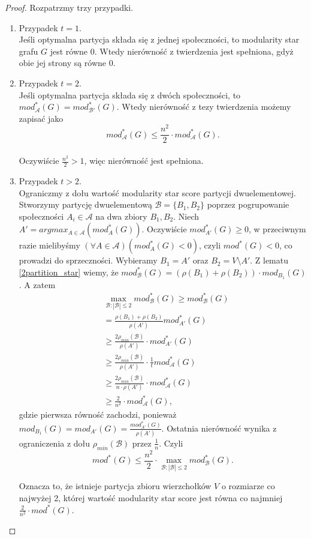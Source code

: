 \documentclass[letterpaper,12pt]{article}
\begin{document}
\begin{proof}
  Rozpatrzmy trzy przypadki.
  \begin{enumerate}
    \item Przypadek \(t=1\).\\
          Jeśli optymalna partycja składa się z jednej społeczności, to modularity star grafu \(G\) jest równe 0. Wtedy nierówność z twierdzenia jest spełniona, gdyż obie jej strony są równe 0.
    \item Przypadek \(t=2\).\\
          Jeśli optymalna partycja składa się z dwóch społeczności, to \(mod_{\mathcal{A}}^*(G) = mod_{\mathcal{B'}}^*(G)\). Wtedy nierówność z tezy twierdzenia możemy zapisać jako
          \[mod_{\mathcal{A}}^*(G) \leq \frac{n^2}{2} \cdot mod_{\mathcal{A}}^*(G).\]\\
          Oczywiście \(\frac{n^2}{2}>1\), więc nierówność jest spełniona.
    \item Przypadek \(t>2\).\\
          Ograniczmy z dołu wartość modularity star score  partycji dwuelementowej. Stworzymy partycję dwuelementową \(\mathcal{B}=\{B_1,B_2\}\) poprzez pogrupowanie społeczności \(A_i\in\mathcal{A}\) na dwa zbiory \(B_1,B_2\). Niech \(A'=argmax_{A \in\mathcal{A}}(mod_{A}^*(G))\). Oczywiście \(mod_{A'}^*(G) \geq 0\), w przeciwnym razie mielibyśmy \((\forall A \in \mathcal{A}) (mod_A^*(G) < 0)\), czyli \(mod^*(G) < 0\), co prowadzi do sprzeczności. Wybieramy \(B_1=A'\) oraz \(B_2=V \setminus A'\). Z lematu \ref{2partition_star} wiemy, że \(mod_{\mathcal{B}}^*(G)=(\rho(B_1)+\rho(B_2))\cdot mod_{B_1}(G)\). A zatem
          \begin{align*}
             & \max_{\mathcal{B}:|\mathcal{B}|\leq 2}mod_{\mathcal{B}}^*(G) \geq mod_{\mathcal{B}}^*(G) \\
             & = \frac{\rho(B_1)+\rho(B_2)}{\rho(A')} mod_{A'}^*(G)                                     \\
             & \geq \frac{2\rho_{min}(\mathcal{B})}{\rho(A')}\cdot mod_{A'}^*(G)                        \\
             & \geq \frac{2\rho_{min}(\mathcal{B})}{\rho(A')} \cdot \frac{1}{t} mod_{\mathcal{A}}^*(G)  \\
             & \geq \frac{2\rho_{min}(\mathcal{B})}{n\cdot \rho(A')} \cdot mod_{\mathcal{A}}^*(G)       \\
             & \geq \frac{2}{n^2} \cdot mod_{\mathcal{A}}^*(G),
          \end{align*}
          gdzie pierwsza równość zachodzi, ponieważ \(mod_{B_1}(G)=mod_{A'}(G)=\frac{mod_{A'}^*(G)}{\rho(A')}\). Ostatnia nierówność wynika z ograniczenia z dołu \(\rho_{min}(\mathcal{B})\) przez \(\frac{1}{n}\). Czyli
          \[mod^*(G) \leq \frac{n^2}{2} \cdot \max_{\mathcal{B}:|\mathcal{B}|\leq 2}mod_{\mathcal{B}}^*(G).\]

          Oznacza to, że istnieje partycja zbioru wierzchołków \(V\) o rozmiarze co najwyżej 2, której wartość modularity star score jest równa co najmniej \(\frac{2}{n^2} \cdot mod^*(G)\).
  \end{enumerate}
\end{proof}
\end{document}
